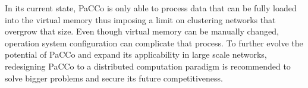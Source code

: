 \documentclass[12pt,journal,compsoc]{IEEEtran}
\numberwithin{equation}{section}
\begin{document}
In its current state, PaCCo is only able to process data that can be fully loaded into the virtual memory thus imposing a limit on clustering networks that overgrow that size. Even though virtual memory can be manually changed, operation system configuration can complicate that process. To further evolve the potential of PaCCo and expand its applicability in large scale networks, redesigning PaCCo to a distributed computation paradigm is recommended to solve bigger problems and secure its future competitiveness.  



%






\end{document}
